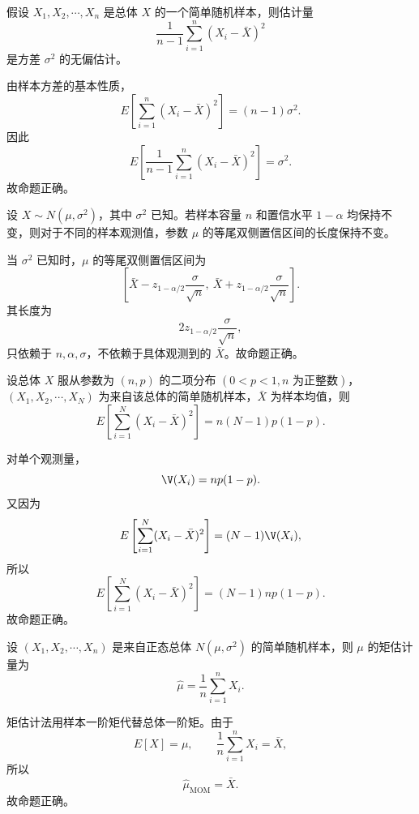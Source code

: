 \begin{question}
假设 $X_1,X_2,\cdots,X_n$ 是总体 $X$ 的一个简单随机样本，则估计量
\[
\frac{1}{n-1}\sum_{i=1}^n(X_i-\bar X)^2
\]
是方差 $\sigma^2$ 的无偏估计。
\begin{solution}
由样本方差的基本性质，
\[
E\left[\sum_{i=1}^n(X_i-\bar X)^2\right]=(n-1)\sigma^2.
\]
因此
\[
E\left[\frac{1}{n-1}\sum_{i=1}^n(X_i-\bar X)^2\right]=\sigma^2.
\]
故命题正确。
\end{solution}
\end{question}

\begin{question}
设 $X\sim N(\mu,\sigma^2)$，其中 $\sigma^2$ 已知。若样本容量 $n$ 和置信水平 $1-\alpha$ 均保持不变，则对于不同的样本观测值，参数 $\mu$ 的等尾双侧置信区间的长度保持不变。
\begin{solution}
当 $\sigma^2$ 已知时，$\mu$ 的等尾双侧置信区间为
\[
\left[\bar X-z_{1-\alpha/2}\frac{\sigma}{\sqrt n},\
\bar X+z_{1-\alpha/2}\frac{\sigma}{\sqrt n}\right].
\]
其长度为
\[
2z_{1-\alpha/2}\frac{\sigma}{\sqrt n},
\]
只依赖于 $n,\alpha,\sigma$，不依赖于具体观测到的 $\bar X$。故命题正确。
\end{solution}
\end{question}

\begin{question}
设总体 $X$ 服从参数为 $(n,p)$ 的二项分布 $(0<p<1,n\text{ 为正整数})$，$(X_1,X_2,\cdots,X_N)$ 为来自该总体的简单随机样本，$\bar X$ 为样本均值，则
\[
E\left[\sum_{i=1}^N(X_i-\bar X)^2\right]=n(N-1)p(1-p).
\]
\begin{solution}
对单个观测量，
\[
\V(X_i)=np(1-p).
\]
又因为
\[
E\left[\sum_{i=1}^N(X_i-\bar X)^2\right]=(N-1)\V(X_i),
\]
所以
\[
E\left[\sum_{i=1}^N(X_i-\bar X)^2\right]
=(N-1)np(1-p).
\]
故命题正确。
\end{solution}
\end{question}

\begin{question}
设 $(X_1,X_2,\cdots,X_n)$ 是来自正态总体 $N(\mu,\sigma^2)$ 的简单随机样本，则 $\mu$ 的矩估计量为
\[
\hat\mu=\frac1n\sum_{i=1}^nX_i.
\]
\begin{solution}
矩估计法用样本一阶矩代替总体一阶矩。由于
\[
E[X]=\mu,
\qquad
\frac1n\sum_{i=1}^nX_i=\bar X,
\]
所以
\[
\hat\mu_{\mathrm{MOM}}=\bar X.
\]
故命题正确。
\anstext{正确}
\end{solution}
\end{question}

